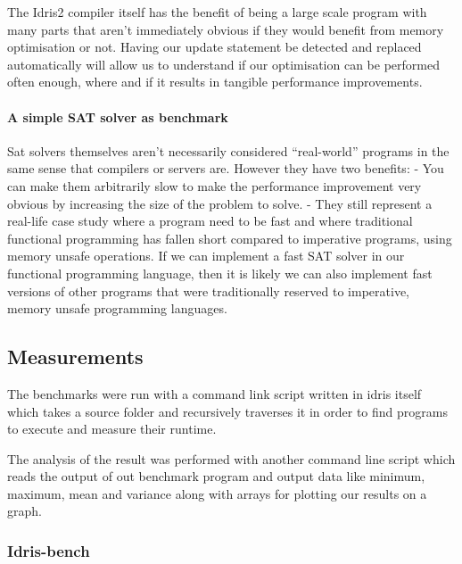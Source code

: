 \documentclass[
]{article}
\begin{document}
The Idris2 compiler itself has the benefit of being a large scale
program with many parts that aren't immediately obvious if they would
benefit from memory optimisation or not. Having our update statement be
detected and replaced automatically will allow us to understand if our
optimisation can be performed often enough, where and if it results in
tangible performance improvements.

\hypertarget{a-simple-sat-solver-as-benchmark}{%
\paragraph{A simple SAT solver as
benchmark}\label{a-simple-sat-solver-as-benchmark}}

Sat solvers themselves aren't necessarily considered ``real-world''
programs in the same sense that compilers or servers are. However they
have two benefits: - You can make them arbitrarily slow to make the
performance improvement very obvious by increasing the size of the
problem to solve. - They still represent a real-life case study where a
program need to be fast and where traditional functional programming has
fallen short compared to imperative programs, using memory unsafe
operations. If we can implement a fast SAT solver in our functional
programming language, then it is likely we can also implement fast
versions of other programs that were traditionally reserved to
imperative, memory unsafe programming languages.

\hypertarget{measurements}{%
\subsection{Measurements}\label{measurements}}

The benchmarks were run with a command link script written in idris
itself which takes a source folder and recursively traverses it in order
to find programs to execute and measure their runtime.

The analysis of the result was performed with another command line
script which reads the output of out benchmark program and output data
like minimum, maximum, mean and variance along with arrays for plotting
our results on a graph.

\hypertarget{idris-bench}{%
\subsubsection{Idris-bench}\label{idris-bench}}
\end{document}
